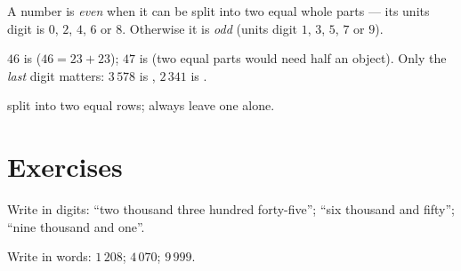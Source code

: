 \begin{definition}\label{def:g3:numbers:evenodd}
A number is \emph{even} when it can be split into
two equal whole parts --- its units digit is $0$, $2$, $4$, $6$ or
$8$. Otherwise it is \emph{odd} (units digit $1$,
$3$, $5$, $7$ or $9$).
\end{definition}

\begin{example}
$46$ is  ($46 = 23 + 23$); $47$ is  (two equal parts would
need half an object). Only the \emph{last} digit matters: $3\,578$ is
, $2\,341$ is .
\end{example}

\begin{omfigure}

{\small {} split into two equal rows;  always
leave one alone.}
\end{omfigure}

\section{Exercises}

\begin{exercise}[$\star$]\label{exo:g3:numbers:1}
Write in digits: ``two thousand three hundred forty-five''; ``six
thousand and fifty''; ``nine thousand and one''.
\end{exercise}

\begin{exercise}[$\star$]\label{exo:g3:numbers:2}
Write in words: $1\,208$; \quad $4\,070$; \quad $9\,999$.
\end{exercise}


